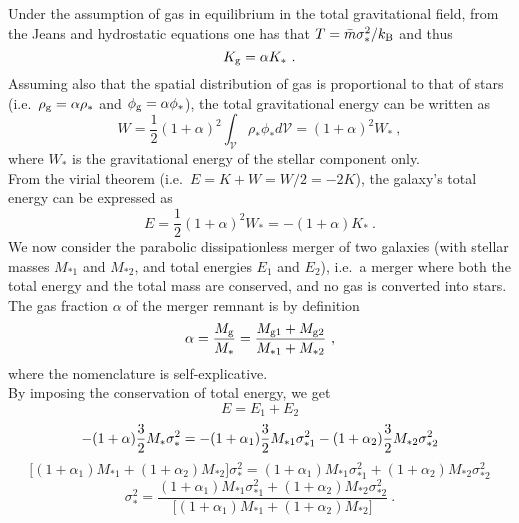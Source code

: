 Under the assumption of gas in equilibrium in the total gravitational field, 
from the Jeans and hydrostatic equations one has that $T = \bar{m} \sigma_*^2 / k_{\rm B}$ and thus 
\begin{equation}
K_{\rm g} = \alpha K_* \ .
\end{equation}
Assuming also that the spatial distribution of gas is proportional to that of stars (i.e.~$\rho_{\rm g} = \alpha \rho_*$ 
and $\phi_{\rm g} = \alpha \phi_*$), 
the total gravitational energy can be written as 
\begin{equation}
W = \frac{1}{2} (1+\alpha)^2 \int_{\mathcal{V}} \rho_* \phi_* d\mathcal{V} = (1+\alpha)^2 W_* \ ,
\end{equation}
where $W_*$ is the gravitational energy of the stellar component only. \\
From the virial theorem (i.e.~$E = K+W = W/2 = -2K$), the galaxy's total energy can be expressed as 
\begin{equation}
E = \frac{1}{2} (1+\alpha)^2 W_* = - (1+\alpha) K_* \ .
\end{equation}
We now consider the parabolic dissipationless merger of two galaxies (with stellar masses $M_{*1}$ and $M_{*2}$,
and total energies $E_1$ and $E_2$), 
i.e.~a merger where both the total energy and the total mass are conserved, 
and no gas is converted into stars. \\
The gas fraction $\alpha$ of the merger remnant is by definition
\begin{equation}
\alpha = \frac{M_{\rm g}}{M_*} = \frac{M_{\rm g1} + M_{\rm g2}}{M_{*1}+M_{*2}} \ ,
\end{equation}
where the nomenclature is self-explicative. \\
By imposing the conservation of total energy, we get 
\begin{equation*}
E = E_1 + E_2 
\end{equation*}
\begin{equation*}
-(1+\alpha) \frac{3}{2} M_* \sigma_*^2 = -(1+\alpha_1) \frac{3}{2} M_{*1} \sigma_{*1}^2 -(1+\alpha_2) \frac{3}{2} M_{*2} \sigma_{*2}^2 \\
\end{equation*}
\begin{equation*}
\bigl[ (1+\alpha_1)M_{*1} + (1+\alpha_2)M_{*2} \bigr ] \sigma_*^2 = (1+\alpha_1)M_{*1}\sigma_{*1}^2 + (1+\alpha_2)M_{*2}\sigma_{*2}^2
\end{equation*}
\begin{equation}
\sigma_*^2 = \frac{(1+\alpha_1)M_{*1}\sigma_{*1}^2 + (1+\alpha_2)M_{*2}\sigma_{*2}^2}{\bigl[ (1+\alpha_1)M_{*1} + (1+\alpha_2)M_{*2} \bigr ]} \ .
\label{eq:sigma*2}
\end{equation}
